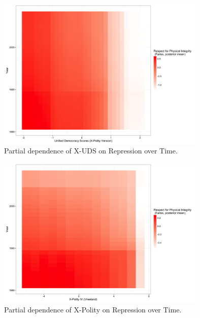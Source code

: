 \documentclass[titlepage, onecolumn,12pt]{article}
\begin{document}
\clearpage

\begin{figure}[ht!]
\begin{center}
\includegraphics[width=100mm]{../figures/latent_mean_uds_xpolity_int_year_tile.png}
\end{center}
\caption{Partial dependence of X-UDS on Repression over Time.}
\label{xuds_rep}
\end{figure}

\begin{figure}[h!]
\begin{center}
\includegraphics[width=100mm]{../figures/latent_mean_xpolity_nas_int_year_tile.png}
\end{center}
\caption{Partial dependence of X-Polity on Repression over Time.}
\label{xpolity_rep}
\end{figure}

\clearpage
\end{document}
